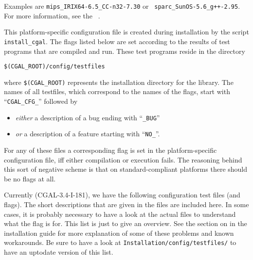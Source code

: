 \noindent Examples are \texttt{mips\_IRIX64-6.5\_CC-n32-7.30} or {\tt
  sparc\_SunOS-5.6\_g++-2.95}. For more information, see the \cgal\ 
.
\ccIndexSubitemEnd{flag}{for OS \& compiler}

This platform-specific configuration file is created during
installation by the script \texttt{install\_cgal}. The flags listed below
are set according to the results of test programs that are compiled and run.
These test programs reside in the directory
\begin{center}
\verb|$(CGAL_ROOT)/config/testfiles|
\end{center}
where \verb|$(CGAL_ROOT)| represents the installation directory for the library.
The names of all testfiles, which correspond to the names of the flags, 
\ccIndexSubitem{workaround flags}{names}
start with ``\texttt{CGAL\_CFG\_}'' followed by
\begin{itemize}
\item \textit{either} a description of a bug ending with
  ``\texttt{\_BUG}''
\item \textit{or} a description of a feature starting with
  ``\texttt{NO\_}''.
\end{itemize}
For any of these files a corresponding flag is set in the 
platform-specific configuration file, iff either compilation or execution
fails. The reasoning behind this sort of negative scheme is that on
standard-compliant platforms there should be no flags at all.


\noindent Currently (CGAL-3.4-I-181), we have the following configuration
test files (and flags). The short descriptions that are given in the files are 
included here. In some cases, it is probably necessary to have a look at the
actual files to understand what the flag is for. This list is just to
give an overview.  See the section on
 in the installation guide
for more explanation of some of these problems and known workarounds. 
Be sure to have a look at \texttt{Installation/config/testfiles/} to have an
uptodate version of this list.


